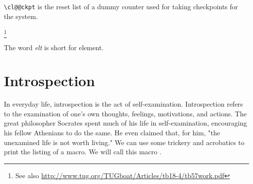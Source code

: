 \texttt{\textbackslash cl@@ckpt}
 is the  reset list of a dummy counter 
used for taking checkpoints for the  system.


\makeatletter
\def\@elt{,   }



\topline

{\footnotesize 
\cl@@ckpt 
}

\bottomline


\begin{teXX}
 \def\cl@@ckpt{\@elt{page}}
\end{teXX}

\footnote{See also \url{http://www.tug.org/TUGboat/Articles/tb18-4/tb57work.pdf}}

The word \textit{elt} is short for element.


\begin{comment}
%
%
%
%
%
%
%
%
%
%
%
%
%

\end{comment}




\section*{Introspection}
In everyday life, introspection is the act of self-examination. Introspection refers to the examination of one's own thoughts, feelings, motivations, and actions. The great philosopher Socrates spent much of his life in self-examination, encouraging his fellow Athenians to do the same. He even claimed that, for him, "the unexamined life is not worth living." We can use some \tex trickery and \latex acrobatics to print the listing of a macro. We will call this macro .

